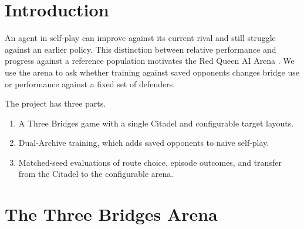 \documentclass[conference,a4paper]{IEEEtran}
\begin{document}
\section{Introduction}
An agent in self-play can improve against its current rival and still struggle against an earlier policy. This distinction between relative performance and progress against a reference population motivates the Red Queen AI Arena \cite{cliff1995tracking}. We use the arena to ask whether training against saved opponents changes bridge use or performance against a fixed set of defenders.

The project has three parts.
\begin{enumerate}
\item A Three Bridges game with a single Citadel and configurable target layouts.
\item Dual-Archive training, which adds saved opponents to naive self-play.
\item Matched-seed evaluations of route choice, episode outcomes, and transfer from the Citadel to the configurable arena.
\end{enumerate}

\section{The Three Bridges Arena}
\end{document}
